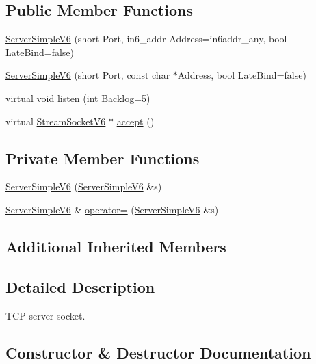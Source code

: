\subsection*{Public Member Functions}
\begin{DoxyCompactItemize}
\item 
\hyperlink{classServerSimpleV6_a6efa36464d2455c565a297c1775bd822}{Server\+Simple\+V6} (short Port, in6\+\_\+addr Address=in6addr\+\_\+any, bool Late\+Bind=false)
\item 
\hyperlink{classServerSimpleV6_afa86ebe69d65a75dc40bd98287887618}{Server\+Simple\+V6} (short Port, const char $\ast$Address, bool Late\+Bind=false)
\item 
virtual void \hyperlink{classServerSimpleV6_a4ea81562c4f7536ab7fe46ecb8e052d9}{listen} (int Backlog=5)
\item 
virtual \hyperlink{classStreamSocketV6}{Stream\+Socket\+V6} $\ast$ \hyperlink{classServerSimpleV6_aae8c9ed7be029ad52254b0ea6540d8f0}{accept} ()
\end{DoxyCompactItemize}
\subsection*{Private Member Functions}
\begin{DoxyCompactItemize}
\item 
\hyperlink{classServerSimpleV6_a1ced02f63d5868928d3f3935ecbecb36}{Server\+Simple\+V6} (\hyperlink{classServerSimpleV6}{Server\+Simple\+V6} \&s)
\item 
\hyperlink{classServerSimpleV6}{Server\+Simple\+V6} \& \hyperlink{classServerSimpleV6_ac40d7415b445df1fdd8b53653dace8ff}{operator=} (\hyperlink{classServerSimpleV6}{Server\+Simple\+V6} \&s)
\end{DoxyCompactItemize}
\subsection*{Additional Inherited Members}


\subsection{Detailed Description}
T\+CP server socket. 

\subsection{Constructor \& Destructor Documentation}
\mbox{\label{classServerSimpleV6_a6efa36464d2455c565a297c1775bd822}} 
